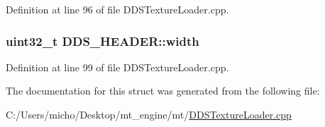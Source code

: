 Definition at line 96 of file D\+D\+S\+Texture\+Loader.\+cpp.

\subsubsection[{\texorpdfstring{width}{width}}]{\setlength{\rightskip}{0pt plus 5cm}uint32\+\_\+t D\+D\+S\+\_\+\+H\+E\+A\+D\+E\+R\+::width}\hypertarget{struct_d_d_s___h_e_a_d_e_r_a2a0b8bcd7ee4d2f097c0216c8d2c2df1_a2a0b8bcd7ee4d2f097c0216c8d2c2df1}{}\label{struct_d_d_s___h_e_a_d_e_r_a2a0b8bcd7ee4d2f097c0216c8d2c2df1_a2a0b8bcd7ee4d2f097c0216c8d2c2df1}


Definition at line 99 of file D\+D\+S\+Texture\+Loader.\+cpp.



The documentation for this struct was generated from the following file\+:\begin{DoxyCompactItemize}
\item 
C\+:/\+Users/micho/\+Desktop/mt\+\_\+engine/mt/\hyperlink{_d_d_s_texture_loader_8cpp}{D\+D\+S\+Texture\+Loader.\+cpp}\end{DoxyCompactItemize}
